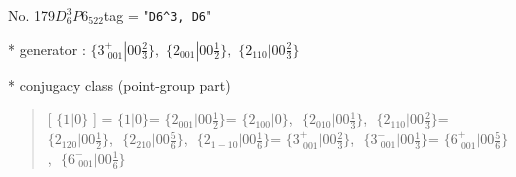 \documentclass[fleqn,10pt,landscape]{jsarticle}
\begin{document}
\newpage

No. 179\quad$D_{6}^{3}$\quad$P6_522$\quad[ hexagonal ]
tag = "{\tt D6^3, D6}"

* generator : $\{3^{+}_{\,\,001}|0 0 \frac{2}{3}\},\,\,\{2{}_{001}|0 0 \frac{1}{2}\},\,\,\{2{}_{110}|0 0 \frac{2}{3}\}$

* conjugacy class (point-group part)
\begin{quote}
[ $\{1|0\}$ ] = \quad $\{1|0\}$\newline[ $\{2{}_{001}|0 0 \frac{1}{2}\}$ ] = \quad $\{2{}_{001}|0 0 \frac{1}{2}\}$\newline[ $\{2{}_{100}|0\}$ ] = \quad $\{2{}_{100}|0\}$,\,\, $\{2{}_{010}|0 0 \frac{1}{3}\}$,\,\, $\{2{}_{110}|0 0 \frac{2}{3}\}$\newline[ $\{2{}_{120}|0 0 \frac{1}{2}\}$ ] = \quad $\{2{}_{120}|0 0 \frac{1}{2}\}$,\,\, $\{2{}_{210}|0 0 \frac{5}{6}\}$,\,\, $\{2{}_{1-10}|0 0 \frac{1}{6}\}$\newline[ $\{3^{+}_{\,\,001}|0 0 \frac{2}{3}\}$ ] = \quad $\{3^{+}_{\,\,001}|0 0 \frac{2}{3}\}$,\,\, $\{3^{-}_{\,\,001}|0 0 \frac{1}{3}\}$\newline[ $\{6^{+}_{\,\,001}|0 0 \frac{5}{6}\}$ ] = \quad $\{6^{+}_{\,\,001}|0 0 \frac{5}{6}\}$,\,\, $\{6^{-}_{\,\,001}|0 0 \frac{1}{6}\}$\newline
\end{quote}
\end{document}
